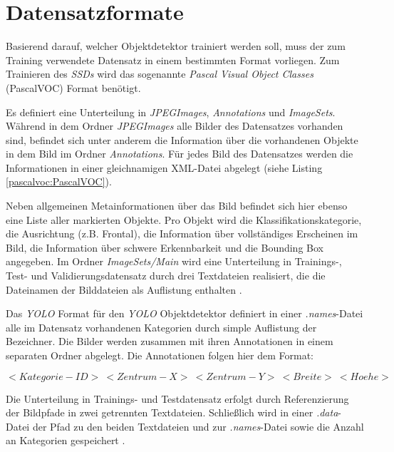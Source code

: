 \section{Datensatzformate} \label{format}

Basierend darauf, welcher Objektdetektor trainiert werden soll, muss der zum Training verwendete Datensatz in einem bestimmten Format vorliegen. Zum Trainieren des \textit{SSDs} wird das sogenannte \textit{Pascal Visual Object Classes} (PascalVOC) Format benötigt. 

Es definiert eine Unterteilung in \textit{JPEGImages}, \textit{Annotations} und \textit{ImageSets}. Während in dem Ordner \textit{JPEGImages} alle Bilder des Datensatzes vorhanden sind, befindet sich unter anderem die Information über die vorhandenen Objekte in dem Bild im Ordner \textit{Annotations}. Für jedes Bild des Datensatzes werden die Informationen in einer gleichnamigen XML-Datei abgelegt (siehe Listing \ref{pascalvoc:PascalVOC}).

\lstset{language=XML}


Neben allgemeinen Metainformationen über das Bild befindet sich hier ebenso eine Liste aller markierten Objekte. Pro Objekt wird die Klassifikationskategorie, die Ausrichtung (z.B. \glqq Frontal\grqq{}), die Information über vollständiges Erscheinen im Bild, die Information über schwere Erkennbarkeit und die Bounding Box angegeben. Im Ordner \textit{ImageSets/Main} wird eine Unterteilung in Trainings-, Test- und Validierungsdatensatz durch drei Textdateien realisiert, die die Dateinamen der Bilddateien als Auflistung enthalten \cite{RenuKhandelwal.2019}. 

Das \textit{YOLO} Format für den \textit{YOLO} Objektdetektor definiert in einer \textit{.names}-Datei alle im Datensatz vorhandenen Kategorien durch simple Auflistung der Bezeichner. Die Bilder werden zusammen mit ihren Annotationen in einem separaten Ordner abgelegt. Die Annotationen folgen hier dem Format:

$<Kategorie-ID>\:<Zentrum-X>\:<Zentrum-Y>\:<Breite>\:<Hoehe>$

Die Unterteilung in Trainings- und Testdatensatz erfolgt durch Referenzierung der Bildpfade in zwei getrennten Textdateien. Schließlich wird in einer \textit{.data}-Datei der Pfad zu den beiden Textdateien und zur \textit{.names}-Datei sowie die Anzahl an Kategorien gespeichert \cite{ArunPonnusamy.20191006}.